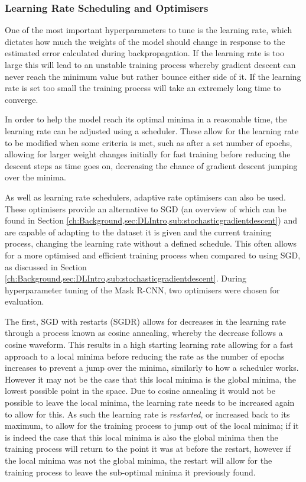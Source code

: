 \subsubsection{Learning Rate Scheduling and Optimisers}\label{ch:cetDet,sec:ModelSelection,sub:TrainingHyperparameters,subsub:learningRateOptimisers}
One of the most important hyperparameters to tune is the learning rate, which dictates how much the weights of the model should change in response to the estimated error calculated during backpropagation. If the learning rate is too large this will lead to an unstable training process whereby gradient descent can never reach the minimum value but rather bounce either side of it. If the learning rate is set too small the training process will take an extremely long time to converge. 

In order to help the model reach its optimal minima in a reasonable time, the learning rate can be adjusted using a scheduler. These allow for the learning rate to be modified when some criteria is met, such as after a set number of epochs, allowing for larger weight changes initially for fast training before reducing the descent steps as time goes on, decreasing the chance of gradient descent jumping over the minima.

As well as learning rate schedulers, adaptive rate optimisers can also be used. These optimisers provide an alternative to SGD (an overview of which can be found in Section \ref{ch:Background,sec:DLIntro,sub:stochasticgradientdescent}) and are capable of adapting to the dataset it is given and the current training process, changing the learning rate without a defined schedule. This often allows for a more optimised and efficient training process when compared to using SGD, as discussed in Section \ref{ch:Background,sec:DLIntro,sub:stochasticgradientdescent}. During hyperparameter tuning of the Mask R-CNN, two optimisers were chosen for evaluation. 

The first, SGD with restarts (SGDR) \cite{loshchilov_sgdr:_2016} allows for decreases in the learning rate through a process known as cosine annealing, whereby the decrease follows a cosine waveform. This results in a high starting learning rate allowing for a fast approach to a local minima before reducing the rate as the number of epochs increases to prevent a jump over the minima, similarly to how a scheduler works. However it may not be the case that this local minima is the global minima, the lowest possible point in the space. Due to cosine annealing it would not be possible to leave the local minima, the learning rate needs to be increased again to allow for this. As such the learning rate is \textit{restarted}, or increased back to its maximum, to allow for the training process to jump out of the local minima; if it is indeed the case that this local minima is also the global minima then the training process will return to the point it was at before the restart, however if the local minima was not the global minima, the restart will allow for the training process to leave the sub-optimal minima it previously found. 


